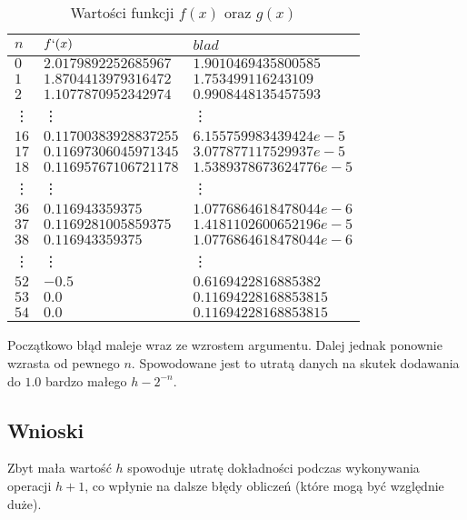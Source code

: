 \documentclass{classrep}
\begin{document}
		\begin{table}[h!]
        	\centering
        	\footnotesize
			\begin{tabular}{lll} \toprule
				$n$ & $f`(x)$ & $blad$ \\ \midrule
				$0$ & $2.0179892252685967$ & $1.9010469435800585$ \\ 
 				$1$ & $1.8704413979316472$ & $1.753499116243109$ \\
 				$2$ & $1.1077870952342974$ & $0.9908448135457593$ \\
 				\vdots & \vdots & \vdots \\
				$16$ & $0.11700383928837255$ & $6.155759983439424e-5$ \\
				$17$ & $0.11697306045971345$	& $3.077877117529937e-5$ \\
				$18$ & $0.11695767106721178$ & $1.5389378673624776e-5$ \\ 				
				\vdots & \vdots & \vdots \\
 				$36$ & $0.116943359375$ & $1.0776864618478044e-6$ \\
 				$37$ & $0.1169281005859375$ & $1.4181102600652196e-5$ \\
 				$38$ & $0.116943359375$ & $1.0776864618478044e-6$ \\
 				\vdots & \vdots & \vdots \\
 				$52$ & $-0.5$ & $0.6169422816885382$ \\
 				$53$ & $0.0$ & $0.11694228168853815$ \\
 				$54$ & $0.0$ & $0.11694228168853815$ \\\bottomrule
 			\end{tabular}
 			\caption{Wartości funkcji $f(x)$ oraz $g(x)$}
			\label{table:10}
		\end{table}		
		Początkowo błąd maleje wraz ze wzrostem argumentu. Dalej jednak ponownie wzrasta od pewnego $n$. Spowodowane jest to utratą danych na skutek
		dodawania do $1.0$ bardzo małego $h-2^{-n}$.		
	\subsection{Wnioski}
	Zbyt mała wartość $h$ spowoduje utratę dokładności podczas wykonywania operacji $h+1$, co wpłynie na dalsze błędy obliczeń 
	(które mogą być względnie duże).
\end{document}
